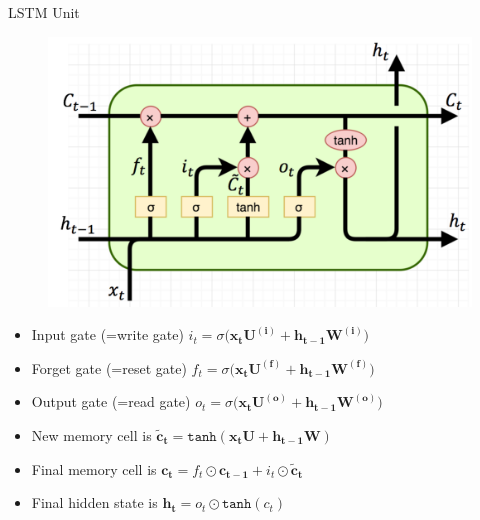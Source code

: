 \documentclass[12pt]{beamer}
\begin{document}
\begin{frame}{LSTM Unit}
	\centering
	\begin{figure}
		\includegraphics[scale=0.15]{./img/lstm.png}
	\end{figure}
	\begin{itemize}
		\item Input gate (=write gate) $i_t = \sigma \big( \bm{x_tU^{(i)}} + \bm{h_{t-1}W^{(i)}}   \big) $
		\item Forget gate (=reset gate) $f_t = \sigma \big( \bm{x_tU^{(f)}} + \bm{h_{t-1}W^{(f)}}   \big) $
		\item Output gate (=read gate) $o_t = \sigma \big( \bm{x_tU^{(o)}} + \bm{h_{t-1}W^{(o)}}   \big) $
		
		\item New memory cell is $\bm{\tilde{c}_t} = \texttt{tanh} ( \bm{x_tU}+\bm{h_{t-1}W} ) $
		\item Final memory cell is $\bm{c_t} = f_t \odot \bm{c_{t-1}} + i_t \odot \bm{\tilde{c}_t}$
		\item Final hidden state is $\bm{h_t} = o_t \odot \texttt{tanh}(c_t)$
	\end{itemize}
\end{frame}
\end{document}
